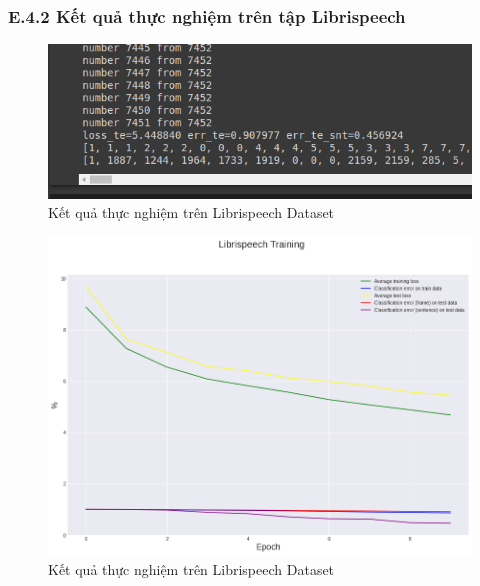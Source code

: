 \documentclass{article}
\begin{document}
	\subsubsection{E.4.2 Kết quả thực nghiệm trên tập Librispeech}
	\begin{figure}[H]
		\centering
		\includegraphics[width=.75\textwidth]{result/evaluate_result_libris.png}
		\caption{Kết quả thực nghiệm trên Librispeech Dataset}
		\label{fig:writing-thesis}
	\end{figure}
	\begin{figure}[H]
		\centering
		\includegraphics[width=.75\textwidth]{result/sincnet_librispeech_plot.png}
		\caption{Kết quả thực nghiệm trên Librispeech Dataset}
		\label{fig:writing-thesis}
	\end{figure}
\end{document}
